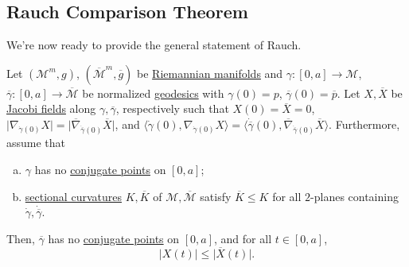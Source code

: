 \subsection{Rauch Comparison Theorem}
We're now ready to provide the general statement of Rauch.

\begin{theorem}\label{thm:Rauch-comparison}
	Let \((\mathcal{M}^m , g)\), \((\overline{\mathcal{M}}^m , \overline{g})\) be \hyperref[def:Riemannian-manifold]{Riemannian manifolds} and \(\gamma \colon [0, a] \to \mathcal{M} \), \(\overline{\gamma} \colon [0, a] \to \overline{\mathcal{M}} \) be normalized \hyperref[def:geodesic]{geodesics} with \(\gamma (0) = p\), \(\overline{\gamma} (0) = \overline{p} \). Let \(X, \overline{X} \) be \hyperref[def:Jacobi-field]{Jacobi fields} along \(\gamma , \overline{\gamma} \), respectively such that \(X(0) = \overline{X} = 0\), \(\vert \nabla_{\dot{\gamma } (0)} X \vert = \vert \overline{\nabla} _{\dot{\overline{\gamma} } (0)}\overline{X}  \vert\), and \(\langle \dot{\gamma }(0) , \nabla _{\dot{\gamma } (0)} X \rangle = \langle \dot{\overline{\gamma} } (0), \overline{\nabla} _{\dot{\overline{\gamma} } (0)} \overline{X} \rangle \). Furthermore, assume that
	\begin{enumerate}[(a)]
		\item \(\gamma \) has no \hyperref[def:conjugate-point]{conjugate points} on \([0, a]\);
		\item \hyperref[def:sectional-curvature]{sectional curvatures} \(K , \overline{K} \) of \(\mathcal{M} , \overline{\mathcal{M}} \) satisfy \(\overline{K} \leq K \) for all \(2\)-planes containing \(\dot{\gamma }, \dot{\overline{\gamma } } \).
	\end{enumerate}

	Then, \(\overline{\gamma} \) has no \hyperref[def:conjugate-point]{conjugate points} on \([0, a]\), and for all \(t\in[0, a]\),
	\[
		\vert X(t) \vert \leq \vert \overline{X} (t) \vert.
	\]
\end{theorem}
